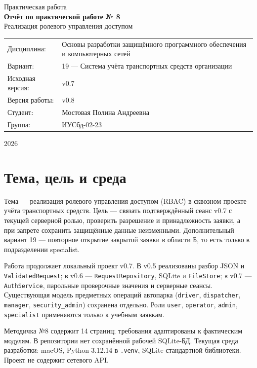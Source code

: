 \documentclass[12pt,a4paper]{article}
\begin{document}
\begin{titlepage}
\centering
\vspace*{1.5cm}
Практическая работа\\[3.2cm]
{\Large\bfseries Отчёт по практической работе № 8}\\[0.6cm]
{\large Реализация ролевого управления доступом}\\[3.4cm]
\begin{tabular}{p{5.2cm}p{9cm}}
Дисциплина: & Основы разработки защищённого программного обеспечения и компьютерных сетей \\
Вариант: & 19 — Система учёта транспортных средств организации \\
Исходная версия: & v0.7 \\
Версия работы: & v0.8 \\
Студент: & Мостовая Полина Андреевна \\
Группа: & ИУСбд-02-23 \\
\end{tabular}
\vfill
2026
\end{titlepage}

\tableofcontents
\clearpage

\section{Тема, цель и среда}
Тема — реализация ролевого управления доступом (RBAC) в сквозном проекте учёта транспортных средств. Цель — связать подтверждённый сеанс v0.7 с текущей серверной ролью, проверить разрешение и принадлежность заявки, а при запрете сохранить защищённые данные неизменными. Дополнительный вариант 19 — повторное открытие закрытой заявки в области Б, то есть только в подразделении specialist.

Работа продолжает локальный проект v0.7. В v0.5 реализованы разбор JSON и \texttt{ValidatedRequest}; в v0.6 — \texttt{RequestRepository}, SQLite и \texttt{FileStore}; в v0.7 — \texttt{AuthService}, парольные проверочные значения и серверные сеансы. Существующая модель предметных операций автопарка (\texttt{driver}, \texttt{dispatcher}, \texttt{manager}, \texttt{security\_admin}) сохранена отдельно. Роли \texttt{user}, \texttt{operator}, \texttt{admin}, \texttt{specialist} применяются только к учебным заявкам.

Методичка №8 содержит 14 страниц; требования адаптированы к фактическим модулям. В репозитории нет сохранённой рабочей SQLite-БД. Текущая среда разработки: macOS, Python 3.12.14 в \texttt{.venv}, SQLite стандартной библиотеки. Проект не содержит сетевого API.
\end{document}
